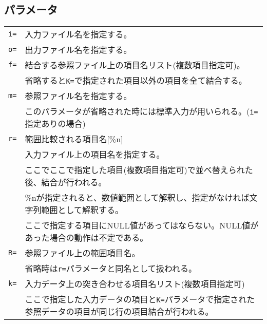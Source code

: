 \subsection*{パラメータ}
\begin{table}[htbp]
{\small
\begin{tabular}{ll}
\verb|i=|    & 入力ファイル名を指定する。\\
\verb|o=|    & 出力ファイル名を指定する。\\
\verb|f=|    & 結合する参照ファイル上の項目名リスト(複数項目指定可)。\\
             & 省略すると\verb|K=|で指定された項目以外の項目を全て結合する。\\
\verb|m=|    & 参照ファイル名を指定する。\\
             & このパラメータが省略された時には標準入力が用いられる。(\verb|i=|指定ありの場合)\\
\verb|r=|    & 範囲比較される項目名[\%n]\\
             & 入力ファイル上の項目名を指定する。\\
			 & ここでここで指定した項目(複数項目指定可)で並べ替えられた後、結合が行われる。\\
             & \%nが指定されると、数値範囲として解釈し、指定がなければ文字列範囲として解釈する。\\
             & ここで指定する項目にNULL値があってはならない。NULL値があった場合の動作は不定である。\\
\verb|R=|    & 参照ファイル上の範囲項目名。\\
             & 省略時は\verb|r=|パラメータと同名として扱われる。 \\
\verb|k=|    & 入力データ上の突き合わせる項目名リスト(複数項目指定可)\\
             & ここで指定した入力データの項目と\verb|K=|パラメータで指定された
               参照データの項目が同じ行の項目結合が行われる。\\

\end{tabular}}
\end{table}
